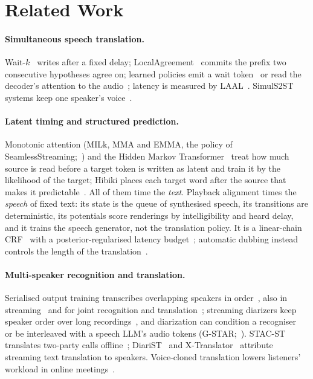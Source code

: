 \section{Related Work}
\label{sec:related}

\paragraph{Simultaneous speech translation.} Wait-$k$~\citep{ma2019stacl} writes after a fixed delay;
LocalAgreement~\citep{liu2020low,polak2022cuni,machacek2023turning} commits the prefix two consecutive hypotheses agree
on; learned policies emit a wait token~\citep{koshkin2024transllama} or read the decoder's attention to the
audio~\citep{papi2023edatt,papi2024streamatt}; latency is measured by LAAL~\citep{papi2022over}. SimulS2ST systems
keep one speaker's voice~\citep{zhang2024streamspeech,seamless2023,labiausse2025hibiki,cheng2025liveinterpret,he2026simuls2st,deng2025simuls2s}.

\paragraph{Latent timing and structured prediction.} Monotonic attention (MILk, MMA and EMMA, the policy of
SeamlessStreaming;~\citealp{arivazhagan2019milk,ma2020mma,ma2023emma}) and the Hidden Markov
Transformer~\citep{zhang2023hmt} treat how much source is read before a target token is written as latent and train it
by the likelihood of the target; Hibiki places each target word after the source that makes it
predictable~\citep{labiausse2025hibiki}. All of them time the \emph{text}. Playback alignment times the \emph{speech} of
fixed text: its state is the queue of synthesised speech, its transitions are deterministic, its potentials score
renderings by intelligibility and heard delay, and it trains the speech generator, not the translation policy. It is a
linear-chain CRF~\citep{lafferty2001crf} with a posterior-regularised latency budget~\citep{ganchev2010posterior};
automatic dubbing instead controls the length of the translation~\citep{lakew2022isometric}.

\paragraph{Multi-speaker recognition and translation.} Serialised output training transcribes overlapping speakers
in order~\citep{kanda2020sot,kanda2021saasr}, also in streaming~\citep{kanda2022tsot} and for joint recognition and
translation~\citep{papi2023tsot}; streaming diarizers keep speaker order over long
recordings~\citep{park2024sortformer,medennikov2025streaming}, and diarization can condition a
recogniser~\citep{polok2026dicow,huo2026tagspeech} or be interleaved with a speech LLM's audio tokens
(G-STAR;~\citealp{peng2026gstar}). STAC-ST translates two-party calls offline~\citep{zuluaga2023stac};
DiariST~\citep{yang2024diarist} and X-Translator~\citep{zhao2026xtranslator} attribute streaming text translation to
speakers. Voice-cloned translation lowers listeners' workload in online meetings~\citep{ma2026samevoice}.
